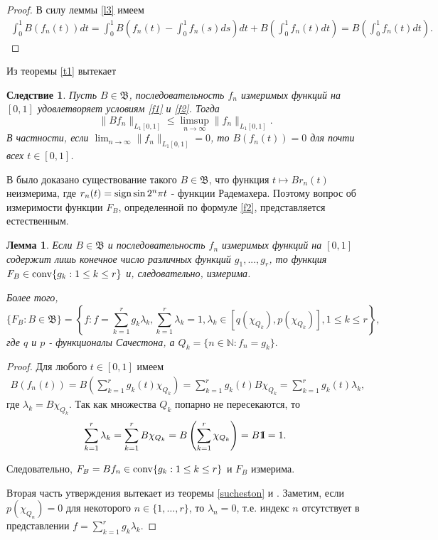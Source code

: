 \documentclass[12pt]{article}
\newcommand{\emm}{\mathrm{1\hspace{-0.3em} I}}
\newtheorem{lem}[thm]{Лемма}
\newtheorem{cor}[thm]{Следствие}
\def\N{{\mathbb{N}}}
\def\B{{\mathfrak{B}}}
\begin{document}
\begin{proof}
В силу леммы \ref{l3} имеем
\begin{align*}
\int_0^1 B(f_n(t)) dt = \int_0^1 B\left(f_n(t)-\int_0^1 f_n(s) ds\right) dt +B\left(\int_0^1 f_n(t) dt\right)= B\left(\int_0^1 f_n(t) dt\right).
\end{align*}
\end{proof}

Из теоремы \ref{t1} вытекает

\begin{cor}
Пусть $B\in \B$, последовательность $f_n$  измеримых функций на $[0,1]$  удовлетворяет условиям \eqref{f1} и  \eqref{f2}.
Тогда
$$\|Bf_n \|_{L_1[0,1]}\le \limsup_{n\to\infty} \|f_n \|_{L_1[0,1]}.$$
В частности, если $\lim_{n\to\infty} \|f_n \|_{L_1[0,1]} = 0$, то $B(f_n(t))=0$ для почти всех $t\in[0,1]$.
\end{cor}

В \cite{FT} было доказано существование такого $B\in \B$, что функция $t\mapsto Br_n(t)$ неизмерима, где $r_n(t)={\rm sign} \sin 2^n\pi t$ - функции Радемахера. Поэтому вопрос об измеримости функции $F_B$, определенной по формуле \eqref{f2}, представляется естественным.

\begin{lem}\label{l5}
Если $B\in \B$ и последовательность $f_n$  измеримых функций на $[0,1]$ содержит лишь конечное число различных функций $g_1, ..., g_r$, то функция $F_B\in {\rm conv} \{g_k : 1\le k \le r\}$ и, следовательно, измерима.

Более того,
$$\{F_B: B\in \B\}= \left\{f : f=\sum_{k=1}^r g_k\lambda_k, \sum_{k=1}^r \lambda_k=1, \lambda_k \in [q(\chi_{Q_k}), p(\chi_{Q_k})],  1\le k \le r\right\},$$
где $q$ и $p$  - функционалы Сачестона, а $Q_k =\{n\in\N : f_n=g_k\}.$
\end{lem}

\begin{proof}
Для любого $t\in[0,1]$ имеем
\begin{align*}
B(f_n(t))= B\left(\sum_{k=1}^r g_k(t) \chi_{Q_k}\right)= \sum_{k=1}^r g_k(t) B\chi_{Q_k}= \sum_{k=1}^r g_k(t) \lambda_k,
\end{align*}
где $\lambda_k=B\chi_{Q_k}.$ Так как множества $Q_k$ попарно не пересекаются, то
\begin{align*}
\sum_{k=1}^r \lambda_k= \sum_{k=1}^r B\chi_{Q_k}= B\left(\sum_{k=1}^r \chi_{Q_k}\right)=B\emm=1.
\end{align*}

Следовательно, $F_B=Bf_n\in {\rm conv} \{g_k : 1\le k \le r\}$ и $F_B$ измерима.

Вторая часть утверждения вытекает из теоремы \ref{sucheston} и \cite[лемма 1]{Natanson}. Заметим, если $p(\chi_{Q_n})=0$ для некоторого $n\in \{1, \dots, r\}$, то $\lambda_n=0$, т.е. индекс $n$ отсутствует в представлении $f=\sum_{k=1}^r g_k\lambda_k$.

\end{proof}
\end{document}

